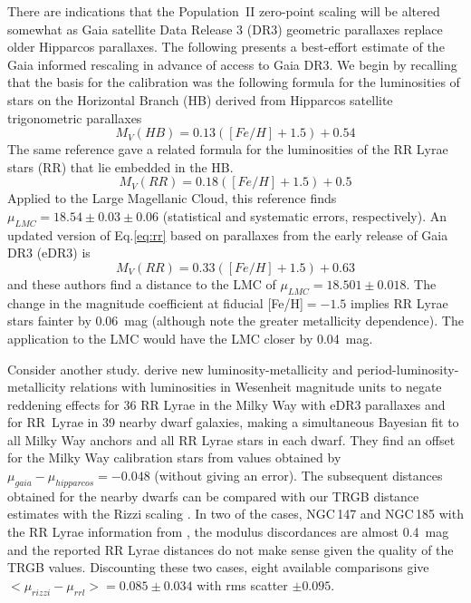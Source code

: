 \documentclass[twocolumn]{aastex63}
\begin{document}
There are indications that the Population~II zero-point scaling will be altered somewhat as
Gaia satellite Data Release 3 (DR3) geometric parallaxes replace older Hipparcos parallaxes.  The following presents a best-effort estimate of the Gaia informed rescaling in advance of access to Gaia DR3.  We begin by recalling that the basis for the \citet{2007ApJ...661..815R} calibration was the following formula for the luminosities of stars on the Horizontal Branch (HB) derived from Hipparcos satellite trigonometric parallaxes \citep{2000ApJ...533..215C}
\begin{equation}
    M_V(HB) = 0.13 ([Fe/H] + 1.5) +0.54
    \label{eq:hb}
\end{equation}
The same reference gave a related formula for the luminosities of the RR Lyrae stars (RR) that lie embedded in the HB.
\begin{equation}
    M_V(RR) = 0.18 ([Fe/H] + 1.5) +0.5
    \label{eq:rr}
\end{equation}
Applied to the Large Magellanic Cloud, this reference finds $\mu_{LMC} = 18.54\pm0.03\pm0.06$ (statistical and systematic errors, respectively).  An updated version of Eq.\ref{eq:rr} based on parallaxes from the early release of Gaia DR3 (eDR3) is \citep{2022MNRAS.513..788G}
\begin{equation}
    M_V(RR) = 0.33 ([Fe/H] + 1.5) +0.63
    \label{eq:rr22}
\end{equation}
and these authors find a distance to the LMC of $\mu_{LMC} = 18.501\pm0.018$.  The change in the magnitude coefficient at fiducial [Fe/H]$= -1.5$ implies RR Lyrae stars fainter by 0.06~mag (although note the greater metallicity dependence).  The application to the LMC would have the LMC closer by 0.04~mag.

Consider another study.  \citet{2022ApJ...932...19N} derive new luminosity-metallicity and period-luminosity-metallicity relations with luminosities in Wesenheit magnitude units to negate reddening effects for 36 RR Lyrae in the Milky Way with eDR3 parallaxes and for RR~Lyrae in 39 nearby dwarf galaxies, making a simultaneous Bayesian fit to all Milky Way anchors and all RR Lyrae stars in each dwarf.  They find an offset for the Milky Way calibration stars from values obtained by \citet{2000ApJ...533..215C} $\mu_{gaia} - \mu_{hipparcos} = -0.048$ (without giving an error).  The subsequent distances obtained for the nearby dwarfs \citep{2022ApJ...932...19N} can be compared with our TRGB distance estimates with the Rizzi scaling \citep{2021AJ....162...80A}.  In two of the cases, NGC\,147 and NGC\,185 with the RR Lyrae information from \citet{2017ApJ...842...60M}, the modulus discordances are almost 0.4~mag and the reported RR Lyrae distances do not make sense given the quality of the TRGB values.  Discounting these two cases, eight available comparisons give $<\mu_{rizzi} - \mu_{rrl}> = 0.085\pm0.034$ with rms scatter $\pm0.095$. 
\end{document}
